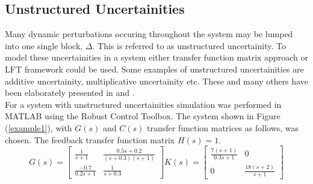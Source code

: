 \documentclass[a4paper,12pt]{article}
\begin{document}
			\subsection{Unstructured Uncertainities} Many dynamic perturbations occuring throughout the system may be lumped into one single block, $\Delta$. This is referred to as unstructured uncertainity. To model these uncertainities in a system either transfer function matrix approach or LFT framework could be used. Some examples of unstructured uncertainities are additive uncertainity, multiplicative uncertainity etc. These and many others have been elaborately presented in \cite{book} and \cite{Gu}.\\
			For a system with unstructured uncertainities simulation was performed in MATLAB using the Robust Control Toolbox. The system shown in Figure (\ref{example1}), with $G(s)$ and $C(s)$ transfer function matrices as follows, was chosen. The feedback transfer function matrix $H(s) =1$. 
			\[
			G(s)=
			\begin{bmatrix}
			\frac{1}{s+1} & \frac{0.5s+0.2}{(s+0.3)(s+1)} \\
			\frac{-0.7}{0.2s+1} & \frac{1}{s+0.3}
			\end{bmatrix}
			K(s)=
			\begin{bmatrix}
			\frac{7(s+1)}{0.3s+1} & 0 \\
			0 & \frac{18(s+2)}{s+1}
			\end{bmatrix}
			\]
			
\end{document}
